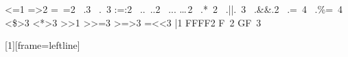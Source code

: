 {   {<=}{{\symbmath{\leq}}}1 {=>}{{\symbmath{\Rightarrow}}}2  {=~=}{{\symbmath{\cong}}}2
   {\ .}{{\symbmath{\circ}}}3 {\ .\ }{{\symbmath{\circ}}}3 {:=:}{{\symbmath{\approx}}}2
   {\ ..}{{{\color{symb}\ .\!\!.}}}2
   {\ ...}{{\ensuremath{\ .\hspace{-.1ex}.\hspace{-.1ex}.}}}2
   {\ .*}{{\ \symbmath{\bullet}}}{2}
   {\ .||.}{{\ \symbmath{\vee}}}3 {\ .&&.}{{\symbmath{\ \wedge}}}2
   {\ .=}{{\ \symbmath{{:}{=}}}}4
   {\ .\%=}{{\ \symbmath{{:}{\Leftarrow}}}}4
   {<\$>}{{\symbmath{{<}\!{\text{\textdollar}}\!{>}}}}3
   {<*>}{{\symbmath{{<}\!\!\!\ast\!\!\!{>}}}}3
   {>>}{{\symbmath{\ll}}}1 {>>=}{{\symbmath{\gg\mkern-6.5mu=}}}3
   {>=>}{{\symbmath{\moncompose}}}3
   {=<<}{{\symbmath{=\mkern-6.5mu\ll}}}3
   {|}{{\symbmath{\mid}}}1
   {FF}{{FF}}2
   {F\ }{{}}2
   {GF\ }{{}}3
}

[1][frame=leftline]{\lstset{language=Haskell, #1}}{}